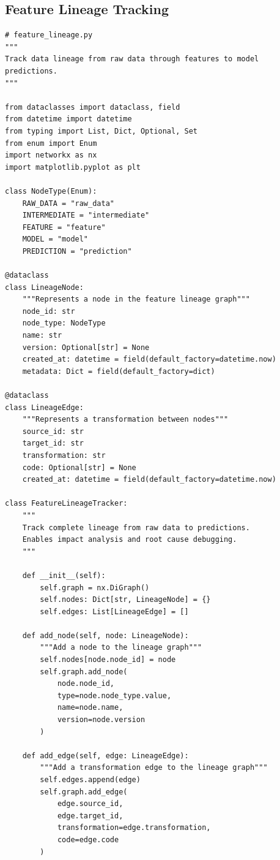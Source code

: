 \subsection{Feature Lineage Tracking}

\begin{lstlisting}[style=python, caption=End-to-end feature lineage tracking system]
# feature_lineage.py
"""
Track data lineage from raw data through features to model predictions.
"""

from dataclasses import dataclass, field
from datetime import datetime
from typing import List, Dict, Optional, Set
from enum import Enum
import networkx as nx
import matplotlib.pyplot as plt

class NodeType(Enum):
    RAW_DATA = "raw_data"
    INTERMEDIATE = "intermediate"
    FEATURE = "feature"
    MODEL = "model"
    PREDICTION = "prediction"

@dataclass
class LineageNode:
    """Represents a node in the feature lineage graph"""
    node_id: str
    node_type: NodeType
    name: str
    version: Optional[str] = None
    created_at: datetime = field(default_factory=datetime.now)
    metadata: Dict = field(default_factory=dict)

@dataclass
class LineageEdge:
    """Represents a transformation between nodes"""
    source_id: str
    target_id: str
    transformation: str
    code: Optional[str] = None
    created_at: datetime = field(default_factory=datetime.now)

class FeatureLineageTracker:
    """
    Track complete lineage from raw data to predictions.
    Enables impact analysis and root cause debugging.
    """

    def __init__(self):
        self.graph = nx.DiGraph()
        self.nodes: Dict[str, LineageNode] = {}
        self.edges: List[LineageEdge] = []

    def add_node(self, node: LineageNode):
        """Add a node to the lineage graph"""
        self.nodes[node.node_id] = node
        self.graph.add_node(
            node.node_id,
            type=node.node_type.value,
            name=node.name,
            version=node.version
        )

    def add_edge(self, edge: LineageEdge):
        """Add a transformation edge to the lineage graph"""
        self.edges.append(edge)
        self.graph.add_edge(
            edge.source_id,
            edge.target_id,
            transformation=edge.transformation,
            code=edge.code
        )


\end{lstlisting}
